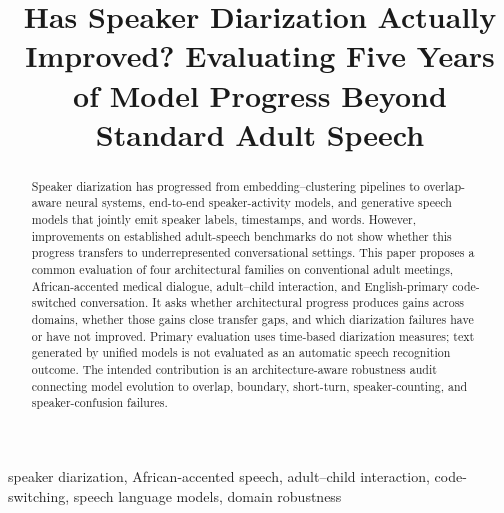 \documentclass[conference,onecolumn]{IEEEtran}
\begin{document}
\title{Has Speaker Diarization Actually Improved? Evaluating Five Years of Model Progress Beyond Standard Adult Speech}

\author{
\and
{}
}

\maketitle

\begin{abstract}
Speaker diarization has progressed from embedding--clustering pipelines to
overlap-aware neural systems, end-to-end speaker-activity models, and
generative speech models that jointly emit speaker labels, timestamps, and
words. However, improvements on established adult-speech benchmarks do not
show whether this progress transfers to underrepresented conversational
settings. This paper proposes a common evaluation of four architectural
families on conventional adult meetings, African-accented medical dialogue,
adult--child interaction, and English-primary code-switched conversation. It
asks whether architectural progress produces gains across domains, whether
those gains close transfer gaps, and which diarization failures have or have
not improved. Primary evaluation uses time-based diarization measures;
text generated by unified models is not evaluated as an automatic speech
recognition outcome. The intended contribution is an architecture-aware
robustness audit connecting model evolution to overlap, boundary, short-turn,
speaker-counting, and speaker-confusion failures.
\end{abstract}

\begin{IEEEkeywords}
speaker diarization, African-accented speech, adult--child interaction,
code-switching, speech language models, domain robustness
\end{IEEEkeywords}
\end{document}

